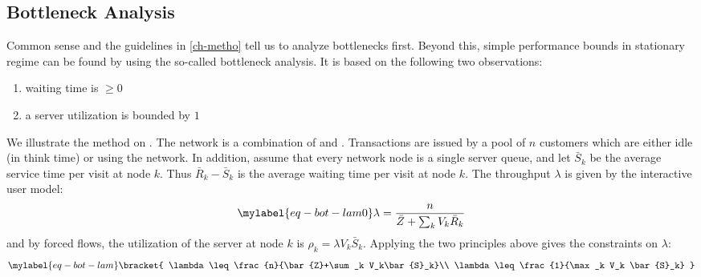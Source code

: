 \subsection{Bottleneck Analysis}
 Common sense and the
guidelines in \cref{ch-metho} tell us to analyze
bottlenecks first. Beyond this, simple
performance bounds in stationary regime can be
found by using the so-called bottleneck analysis.
It is based on the following two observations:
\begin{enumerate}
  \item waiting time is $\geq 0$
  \item a server utilization
is bounded by $1$
\end{enumerate}
%
 \begin{figure}[!htbp]\begin{center}
 \end{center}
\end{figure}
%
We illustrate the method on . The
network is a combination of  and
. Transactions are issued by a pool of $n$
customers which are either idle (in think time) or using the
network. In addition, assume that every network node is a
single server queue, and let $\bar{S}_k$ be the average service
time per visit at node $k$. Thus $\bar{R}_k-\bar{S}_k$ is the
average waiting time per visit at node $k$. The throughput
$\lambda$ is given by the interactive user model:
\begin{equation}\mylabel{eq-bot-lam0}
\lambda= \frac{n}{\bar{Z}+\sum_k V_k\bar{R}_k}
\end{equation}
and by forced flows, the utilization of the
server at node $k$ is $\rho_k=\lambda V_k
\bar{S}_k$. Applying the two principles above
gives the constraints on $\lambda$:
\begin{equation}\mylabel{eq-bot-lam}
  \bracket{
 \lambda \leq \frac{n}{\bar{Z}+\sum_k V_k\bar{S}_k}\\
 \lambda \leq \frac{1}{\max_k V_k \bar{S}_k}
  }
\end{equation}
